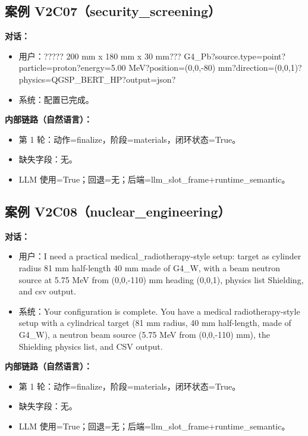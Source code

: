 \documentclass[11pt]{ctexart}
\begin{document}
\subsection{案例 V2C07（security\_screening）}
\textbf{对话：}
\begin{itemize}
\item 用户：????? 200 mm x 180 mm x 30 mm??? G4\_Pb?source.type=point?particle=proton?energy=5.00 MeV?position=(0,0,-80) mm?direction=(0,0,1)?physics=QGSP\_BERT\_HP?output=json?
\item 系统：配置已完成。
\end{itemize}
\textbf{内部链路（自然语言）：}
\begin{itemize}
\item 第 1 轮：动作=finalize，阶段=materials，闭环状态=True。
\item 缺失字段：无。
\item LLM 使用=True；回退=无；后端=llm\_slot\_frame+runtime\_semantic。
\end{itemize}
\subsection{案例 V2C08（nuclear\_engineering）}
\textbf{对话：}
\begin{itemize}
\item 用户：I need a practical medical\_radiotherapy-style setup: target as cylinder radius 81 mm half-length 40 mm made of G4\_W, with a beam neutron source at 5.75 MeV from (0,0,-110) mm heading (0,0,1), physics list Shielding, and csv output.
\item 系统：Your configuration is complete. You have a medical radiotherapy-style setup with a cylindrical target (81 mm radius, 40 mm half-length, made of G4\_W), a neutron beam source (5.75 MeV from (0,0,-110) mm), the Shielding physics list, and CSV output.
\end{itemize}
\textbf{内部链路（自然语言）：}
\begin{itemize}
\item 第 1 轮：动作=finalize，阶段=materials，闭环状态=True。
\item 缺失字段：无。
\item LLM 使用=True；回退=无；后端=llm\_slot\_frame+runtime\_semantic。
\end{itemize}
\end{document}
